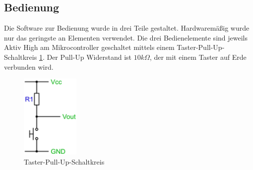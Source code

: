 \subsection{Bedienung}
Die Software zur Bedienung wurde in drei Teile gestaltet. Hardwaremäßig wurde nur das geringste an Elementen verwendet. Die drei Bedienelemente sind jeweils Aktiv High am Mikrocontroller geschaltet mittels einem Taster-Pull-Up-Schaltkreis \ref{fig:SwitchPullUp_Software}. Der Pull-Up Widerstand ist $10k\Omega$, der mit einem Taster auf Erde verbunden wird.

\begin{figure}[h]
	\centering
		\includegraphics[width=0.25\textwidth]{switchpullupcircuit.jpg}
	\caption{Taster-Pull-Up-Schaltkreis}
	\label{fig:SwitchPullUp_Software}
\end{figure}


